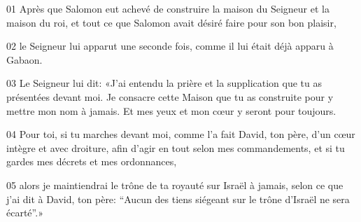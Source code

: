01 Après que Salomon eut achevé de construire la maison du Seigneur et la maison du roi, et tout ce que Salomon avait désiré faire pour son bon plaisir,

02 le Seigneur lui apparut une seconde fois, comme il lui était déjà apparu à Gabaon.

03 Le Seigneur lui dit: «J’ai entendu la prière et la supplication que tu as présentées devant moi. Je consacre cette Maison que tu as construite pour y mettre mon nom à jamais. Et mes yeux et mon cœur y seront pour toujours.

04 Pour toi, si tu marches devant moi, comme l’a fait David, ton père, d’un cœur intègre et avec droiture, afin d’agir en tout selon mes commandements, et si tu gardes mes décrets et mes ordonnances,

05 alors je maintiendrai le trône de ta royauté sur Israël à jamais, selon ce que j’ai dit à David, ton père: “Aucun des tiens siégeant sur le trône d’Israël ne sera écarté”.»
